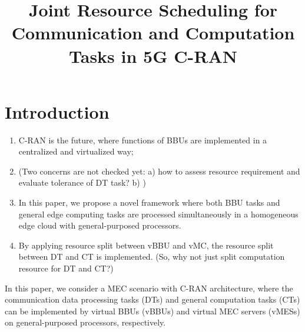 \documentclass[journal, 12pt, onecolumn, draftclsnofoot]{IEEEtran}
\newcommand{\fixit}[1]{{\leavevmode\color{red}(#1)}}
\newcommand{\deny}[1]{}
\begin{document}
	
	\title{
		Joint Resource Scheduling for \deny{Heterogeneous} Communication and Computation Tasks in 5G C-RAN
	}
	\author{
    }%
	\maketitle

\section{Introduction}
	\begin{enumerate}
		\item C-RAN is the future, where functions of BBUs are implemented in a centralized and virtualized way;
		\item \fixit{Two concerns are not checked yet: a) how to assess resource requirement and evaluate tolerance of DT task? b) }
		\item In this paper, we propose a novel framework where both BBU tasks and general edge computing tasks are processed simultaneously in a homogeneous edge cloud with general-purposed processors.
		\item By applying resource split between vBBU and vMC, the resource split between DT and CT is implemented. \fixit{So, why not just split computation resource for DT and CT?} 
	\end{enumerate}

	In this paper, we consider a MEC scenario with C-RAN architecture,
	where the communication data processing tasks (DTs) and general computation tasks (CTs) can be implemented by virtual BBUs (vBBUs) and virtual MEC servers (vMESs) on general-purposed processors, respectively.
\end{document}
